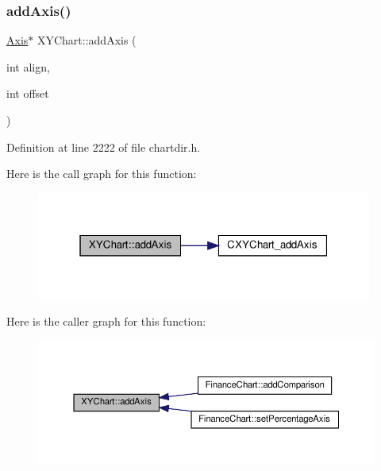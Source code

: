 \subsubsection{\texorpdfstring{add\+Axis()}{addAxis()}}
{\footnotesize\ttfamily \hyperlink{class_axis}{Axis}$\ast$ X\+Y\+Chart\+::add\+Axis (\begin{DoxyParamCaption}\item[{int}]{align,  }\item[{int}]{offset }\end{DoxyParamCaption})\hspace{0.3cm}{\ttfamily [inline]}}



Definition at line 2222 of file chartdir.\+h.

Here is the call graph for this function\+:
\nopagebreak
\begin{figure}[H]
\begin{center}
\leavevmode
\includegraphics[width=313pt]{class_x_y_chart_a90c3eb8c1597a2f50e63e84555d51a22_cgraph}
\end{center}
\end{figure}
Here is the caller graph for this function\+:
\nopagebreak
\begin{figure}[H]
\begin{center}
\leavevmode
\includegraphics[width=350pt]{class_x_y_chart_a90c3eb8c1597a2f50e63e84555d51a22_icgraph}
\end{center}
\end{figure}
\mbox{\label{class_x_y_chart_afb3bb487fa8f9ea3c2d142cb7fed7eab}} 
